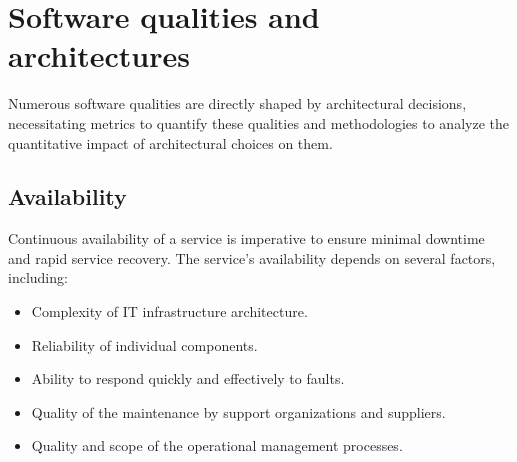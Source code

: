 \section{Software qualities and architectures}

Numerous software qualities are directly shaped by architectural decisions, necessitating metrics to quantify these qualities and methodologies to analyze the quantitative impact of architectural choices on them.

\subsection{Availability}
Continuous availability of a service is imperative to ensure minimal downtime and rapid service recovery.
The service's availability depends on several factors, including:
\begin{itemize}
    \item Complexity of IT infrastructure architecture.
    \item Reliability of individual components.
    \item Ability to respond quickly and effectively to faults.
    \item Quality of the maintenance by support organizations and suppliers.
    \item Quality and scope of the operational management processes.
\end{itemize}

